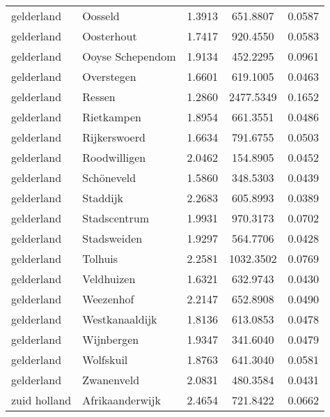 \begin{longtable}{llccc}
	gelderland    & Oosseld                          & 1.3913  & 651.8807  & 0.0587          \\
	gelderland    & Oosterhout                       & 1.7417  & 920.4550  & 0.0583          \\
	gelderland    & Ooyse Schependom                 & 1.9134  & 452.2295  & 0.0961          \\
	gelderland    & Overstegen                       & 1.6601  & 619.1005  & 0.0463          \\
	gelderland    & Ressen                           & 1.2860  & 2477.5349 & 0.1652          \\
	gelderland    & Rietkampen                       & 1.8954  & 661.3551  & 0.0486          \\
	gelderland    & Rijkerswoerd                     & 1.6634  & 791.6755  & 0.0503          \\
	gelderland    & Roodwilligen                     & 2.0462  & 154.8905  & 0.0452          \\
	gelderland    & Schöneveld                       & 1.5860  & 348.5303  & 0.0439          \\
	gelderland    & Staddijk                         & 2.2683  & 605.8993  & 0.0389          \\
	gelderland    & Stadscentrum                     & 1.9931  & 970.3173  & 0.0702          \\
	gelderland    & Stadsweiden                      & 1.9297  & 564.7706  & 0.0428          \\
	gelderland    & Tolhuis                          & 2.2581  & 1032.3502 & 0.0769          \\
	gelderland    & Veldhuizen                       & 1.6321  & 632.9743  & 0.0430          \\
	gelderland    & Weezenhof                        & 2.2147  & 652.8908  & 0.0490          \\
	gelderland    & Westkanaaldijk                   & 1.8136  & 613.0853  & 0.0478          \\
	gelderland    & Wijnbergen                       & 1.9347  & 341.6040  & 0.0479          \\
	gelderland    & Wolfskuil                        & 1.8763  & 641.3040  & 0.0581          \\
	gelderland    & Zwanenveld                       & 2.0831  & 480.3584  & 0.0431          \\
	zuid holland  & Afrikaanderwijk                  & 2.4654  & 721.8422  & 0.0662          \\

\end{longtable}
